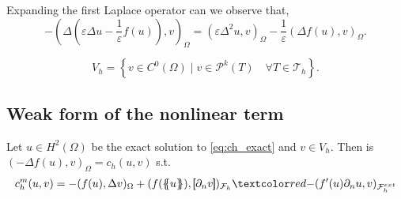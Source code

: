 Expanding the first Laplace operator can we observe that,
\[
- ( \Delta ( \varepsilon  \Delta u - \frac{1}{\varepsilon } f( u) ) ,v )_{\Omega } = (  \varepsilon   \Delta^{2} u ,v )_{\Omega } - \frac{1}{\varepsilon } ( \Delta f( u)  ,v )_{\Omega }.
\]


\[
V_{h} = \left\{ v \in C^{0}( \Omega )   \mid v\in \mathcal{P} ^{k} ( T) \quad \forall T \in \mathcal{T} _{h} \right\}.
\]


\subsection{Weak form of the nonlinear term}%
\label{sub:derivation_of_the_cahn_hilliard_cip_formulation}

\begin{lemma}
    Let $u \in H^2( \Omega ) $ be the exact solution to \eqref{eq:ch_exact} and $v \in V_{h}$.
Then is $( -\Delta f( u) , v)_{\Omega } = c_{h}(u,v )   $ s.t.
\[
    c^{m}_{h} ( u,v) = - ( f( u), \Delta v )_{ \Omega } + ( f( \mean{ u }  ), \jump{ \partial _{n} v }   )_{\mathcal{F}_{h} }  \red{- ( f' (  u  )  \partial _{n}u ,  v      )_{\mathcal{F}_{h} ^{ext}}}
\]

\end{lemma}

